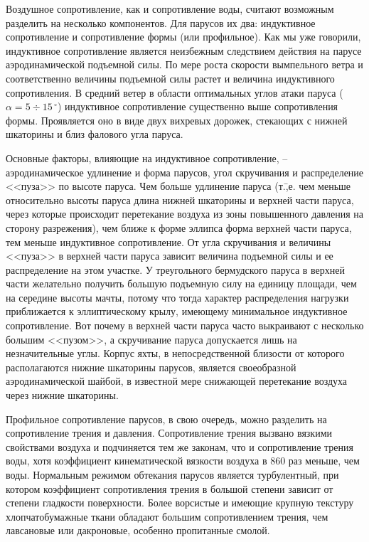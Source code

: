\documentclass[a4paper, 12pt, twoside, final, book, russian, fittopage, cyremdash]{ncc}
\newcommand{\gr}{\ensuremath{\,^\circ}\xspace}
\newcommand{\motdo}{\div}
\begin{document}
Воздушное сопротивление, как и сопротивление воды, считают возможным разделить на несколько компонентов. Для парусов их два: индуктивное сопротивление и сопротивление формы (или профильное). Как мы уже говорили, индуктивное сопротивление является неизбежным следствием действия на парусе аэродинамической подъемной силы. По мере роста скорости вымпельного ветра и соответственно величины подъемной силы растет и величина индуктивного сопротивления. В средний ветер в области оптимальных углов атаки паруса ($\alpha = 5\motdo 15\gr$) индуктивное сопротивление существенно выше сопротивления формы. Проявляется оно в виде двух вихревых дорожек, стекающих с нижней шкаторины и близ фалового угла паруса.
 
Основные факторы, влияющие на индуктивное сопротивление, \--- аэродинамическое удлинение и форма парусов, угол скручивания и распределение <<пуза>> по высоте паруса. Чем больше удлинение паруса (т.\=,е. чем меньше относительно высоты паруса длина нижней шкаторины и верхней части паруса, через которые происходит перетекание воздуха из зоны повышенного давления на сторону разрежения), чем ближе к форме эллипса форма верхней части паруса, тем меньше индуктивное сопротивление. От угла скручивания и величины <<пуза>> в верхней части паруса зависит величина подъемной силы и ее распределение на этом участке. У треугольного бермудского паруса в верхней части желательно получить большую подъемную силу на единицу площади, чем на середине высоты мачты, потому что тогда характер распределения нагрузки приближается к эллиптическому крылу, имеющему минимальное индуктивное сопротивление. Вот почему в верхней части паруса часто выкраивают с несколько большим <<пузом>>, а скручивание паруса допускается лишь на незначительные углы. Корпус яхты, в непосредственной близости от которого располагаются нижние шкаторины парусов, является своеобразной аэродинамической шайбой, в известной мере снижающей перетекание воздуха через нижние шкаторины. 

Профильное сопротивление парусов, в свою очередь, можно разделить на сопротивление трения и давления. Сопротивление трения вызвано вязкими свойствами воздуха и подчиняется тем же законам, что и сопротивление трения воды, хотя коэффициент кинематической вязкости воздуха в 860 раз меньше, чем воды. Нормальным режимом обтекания парусов является турбулентный, при котором коэффициент сопротивления трения в большой степени зависит от степени гладкости поверхности. Более ворсистые и имеющие крупную текстуру хлопчатобумажные ткани обладают большим сопротивлением трения, чем лавсановые или дакроновые, особенно пропитанные смолой. 
\end{document}
